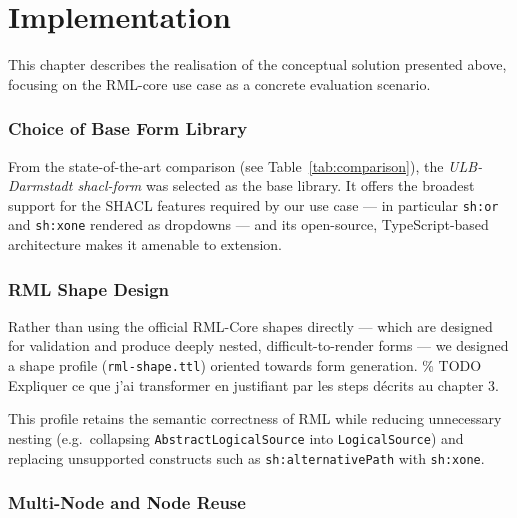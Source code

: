 
\chapter{Implementation}
\label{chap:implementation}


This chapter describes the realisation of the conceptual solution presented above,
focusing on the RML-core use case as a concrete evaluation scenario.

\subsection{Choice of Base Form Library}

From the state-of-the-art comparison (see Table~\ref{tab:comparison}), the
\textit{ULB-Darmstadt shacl-form} was selected as the base library. It offers the
broadest support for the SHACL features required by our use case --- in particular
\texttt{sh:or} and \texttt{sh:xone} rendered as dropdowns --- and its open-source,
TypeScript-based architecture makes it amenable to extension.

\subsection{RML Shape Design}

Rather than using the official RML-Core shapes directly --- which are designed for
validation and produce deeply nested, difficult-to-render forms --- we designed a
shape profile (\texttt{rml-shape.ttl}) oriented towards form
generation.
\% TODO Expliquer ce que j'ai transformer en justifiant par les steps décrits au chapter 3.

This profile retains the semantic correctness of RML while reducing
unnecessary nesting (e.g.\ collapsing \texttt{AbstractLogicalSource} into
\texttt{LogicalSource}) and replacing unsupported constructs such as
\texttt{sh:alternativePath} with \texttt{sh:xone}.

\subsection{Multi-Node and Node Reuse}

